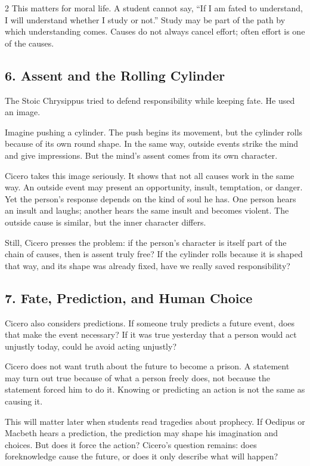 \documentclass[12pt]{article}
\begin{document}
\begin{multicols}{2}
This matters for moral life. A student cannot say, ``If I am fated to understand, I will understand whether I study or not.'' Study may be part of the path by which understanding comes. Causes do not always cancel effort; often effort is one of the causes.

\subsection*{6. Assent and the Rolling Cylinder}
The Stoic Chrysippus tried to defend responsibility while keeping fate. He used an image.

Imagine pushing a cylinder. The push begins its movement, but the cylinder rolls because of its own round shape. In the same way, outside events strike the mind and give impressions. But the mind's assent comes from its own character.

Cicero takes this image seriously. It shows that not all causes work in the same way. An outside event may present an opportunity, insult, temptation, or danger. Yet the person's response depends on the kind of soul he has. One person hears an insult and laughs; another hears the same insult and becomes violent. The outside cause is similar, but the inner character differs.

Still, Cicero presses the problem: if the person's character is itself part of the chain of causes, then is assent truly free? If the cylinder rolls because it is shaped that way, and its shape was already fixed, have we really saved responsibility?

\subsection*{7. Fate, Prediction, and Human Choice}
Cicero also considers predictions. If someone truly predicts a future event, does that make the event necessary? If it was true yesterday that a person would act unjustly today, could he avoid acting unjustly?

Cicero does not want truth about the future to become a prison. A statement may turn out true because of what a person freely does, not because the statement forced him to do it. Knowing or predicting an action is not the same as causing it.

This will matter later when students read tragedies about prophecy. If Oedipus or Macbeth hears a prediction, the prediction may shape his imagination and choices. But does it force the action? Cicero's question remains: does foreknowledge cause the future, or does it only describe what will happen?


\end{multicols}
\end{document}
